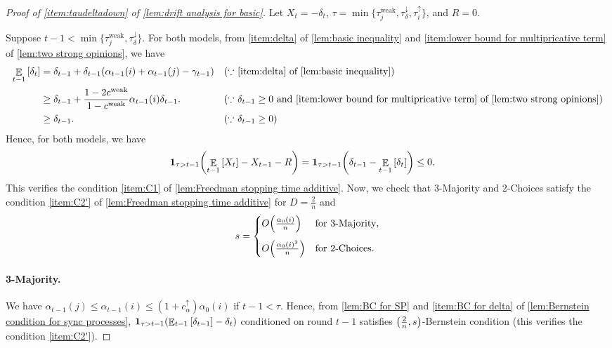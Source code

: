 \documentclass[letterpaper,11pt]{article}
\newcommand{\indicator}{\mathbf{1}}
\DeclareMathOperator*{\E}{\mathbb{E}}
\newcommand{\alphanorm}{\gamma}
\newcommand{\cweak}{c^{\mathrm{weak}}}
\newcommand{\calphaup}{c^{\uparrow}_\alpha}
\newcommand{\bounded}{D}
\newcommand{\variance}{s}
\newcommand{\taudeltadown}{\tau^{\downarrow}_\delta}
\newcommand{\tauiup}{\tau^{\uparrow}_i}
\newcommand{\taujweak}{\tau^{\mathrm{weak}}_j}
\newcommand{\drift}{R}
\begin{document}
    \begin{proof}[Proof of \cref{item:taudeltadown} of \cref{lem:drift analysis for basic}]
    Let $X_t = -\delta_t$, $\tau = \min\{\taujweak, \taudeltadown, \tauiup\}$, and $ \drift = 0 $.
    
    Suppose $t-1 <  \min\{ \taujweak, \taudeltadown\}$.
    For both models, from 
    \cref{item:delta} of \cref{lem:basic inequality} and 
    \cref{item:lower bound for multipricative term} of \cref{lem:two strong opinions}, we have
    \begin{align} 
        \E_{t-1}\qty[ \delta_t ] &= \delta_{t-1}  + \delta_{t-1}\qty(\alpha_{t-1}(i) + \alpha_{t-1}(j) - \alphanorm_{t-1} ) 
        && (\text{$\because$ \cref{item:delta} of \cref{lem:basic inequality}})\nonumber\\
        &\geq \delta_{t-1} + \frac{1-2\cweak}{1-\cweak}\alpha_{t-1}(i)\delta_{t-1}.  
        && (\text{$\because$ $\delta_{t-1}\ge 0$ and \cref{item:lower bound for multipricative term} of \cref{lem:two strong opinions}}) \label{eq:Edelta sync}\\
        &\geq \delta_{t-1}. && (\text{$\because$ $\delta_{t-1}\ge 0$}) \nonumber
    \end{align}
    Hence, for both models, we have
      \begin{align*}
        \indicator_{\tau>t-1}\qty(\E_{t-1}\qty[ X_t ]-X_{t-1}-R)
        &=\indicator_{\tau>t-1}\qty(\delta_{t-1}-\E_{t-1}\qty[\delta_t])
        \leq 0.
    \end{align*}
  This verifies the condition \ref{item:C1} of \cref{lem:Freedman stopping time additive}.
    Now, we check that 3-Majority and 2-Choices satisfy the condition \ref{item:C2'} of \cref{lem:Freedman stopping time additive} 
      for $ \bounded = \frac{2}{n} $ and
    \begin{align}  \label{eq:variance deltaup}
       \variance = \begin{cases}
          O\qty( \frac{\alpha_{0}(i)}{n} )	& \text{for 3-Majority},\\[10pt]
          O\qty( \frac{\alpha_{0}(i)^2}{n} ) & \text{for 2-Choices}.
       \end{cases} 
    \end{align}

    \paragraph*{3-Majority.}
    We have $\alpha_{t-1}(j) \le \alpha_{t-1}(i) \le (1+\calphaup)\alpha_0(i)$ if $ t-1 < \tau $.
    Hence, from \cref{lem:BC for SP} and \cref{item:BC for delta} of \cref{lem:Bernstein condition for sync processes}, 
    $\indicator_{\tau>t-1}\qty(\E_{t-1}\qty[ \delta_{t-1}]-\delta_t)$ conditioned on round $t-1$ satisfies $\qty(\frac{2}{n},\variance)$-Bernstein condition (this verifies the condition \ref{item:C2'}).
    

\end{proof}
\end{document}
